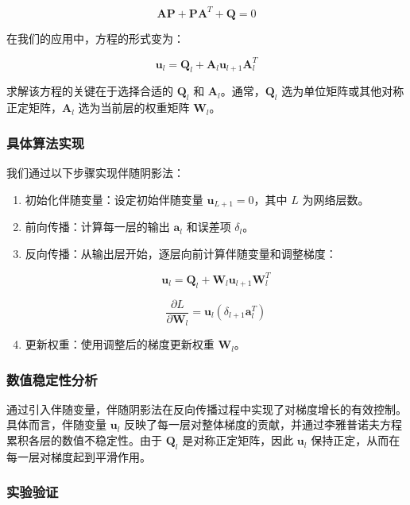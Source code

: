 \documentclass[12pt,a4paper]{amsart}
\begin{document}
\[ \mathbf{A} \mathbf{P} + \mathbf{P} \mathbf{A}^T + \mathbf{Q} = 0 \]

在我们的应用中，方程的形式变为：

\[ \mathbf{u}_l = \mathbf{Q}_l + \mathbf{A}_l \mathbf{u}_{l+1} \mathbf{A}_l^T \]

求解该方程的关键在于选择合适的 \( \mathbf{Q}_l \) 和 \( \mathbf{A}_l \)。通常，\( \mathbf{Q}_l \) 选为单位矩阵或其他对称正定矩阵，\( \mathbf{A}_l \) 选为当前层的权重矩阵 \( \mathbf{W}_l \)。

\subsubsection{具体算法实现}

我们通过以下步骤实现伴随阴影法：

\begin{enumerate}

  \item 初始化伴随变量：设定初始伴随变量 \( \mathbf{u}_{L+1} = 0 \)，其中 \( L \) 为网络层数。

  \item 前向传播：计算每一层的输出 \( \mathbf{a}_l \) 和误差项 \( \delta_l \)。

  \item 反向传播：从输出层开始，逐层向前计算伴随变量和调整梯度：

  \[ \mathbf{u}_l = \mathbf{Q}_l + \mathbf{W}_l \mathbf{u}_{l+1} \mathbf{W}_l^T \]

  \[ \frac{\partial L}{\partial \mathbf{W}_l} = \mathbf{u}_l (\delta_{l+1} \mathbf{a}_l^T) \]

  \item 更新权重：使用调整后的梯度更新权重 \( \mathbf{W}_l \)。

\end{enumerate}

\subsubsection{数值稳定性分析}

通过引入伴随变量，伴随阴影法在反向传播过程中实现了对梯度增长的有效控制。具体而言，伴随变量 \( \mathbf{u}_l \) 反映了每一层对整体梯度的贡献，并通过李雅普诺夫方程累积各层的数值不稳定性。由于 \( \mathbf{Q}_l \) 是对称正定矩阵，因此 \( \mathbf{u}_l \) 保持正定，从而在每一层对梯度起到平滑作用。

\subsubsection{实验验证}
\end{document}
